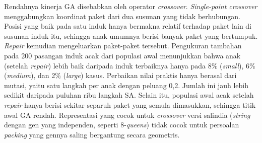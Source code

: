 Rendahnya kinerja GA disebabkan oleh operator \textit{crossover}. \textit{Single-point
crossover} menggabungkan koordinat paket dari dua susunan yang tidak berhubungan.
Posisi yang baik pada satu induk hanya bermakna relatif terhadap paket lain di susunan
induk itu, sehingga anak umumnya berisi banyak paket yang bertumpuk. \textit{Repair}
kemudian mengeluarkan paket-paket tersebut. Pengukuran tambahan pada 200 pasangan induk
acak dari populasi awal menunjukkan bahwa anak (setelah \textit{repair}) lebih baik
daripada induk terbaiknya hanya pada 8\% (\textit{small}), 6\% (\textit{medium}), dan
2\% (\textit{large}) kasus. Perbaikan nilai praktis hanya berasal dari mutasi, yaitu
satu langkah per anak dengan peluang 0,2. Jumlah ini jauh lebih sedikit daripada
puluhan ribu langkah SA. Selain itu, populasi awal acak setelah \textit{repair} hanya
berisi sekitar separuh paket yang semula dimasukkan, sehingga titik awal GA rendah.
Representasi yang cocok untuk \textit{crossover} versi salindia (\textit{string} dengan
gen yang independen, seperti 8-\textit{queens}) tidak cocok untuk persoalan
\textit{packing} yang gennya saling bergantung secara geometris.

